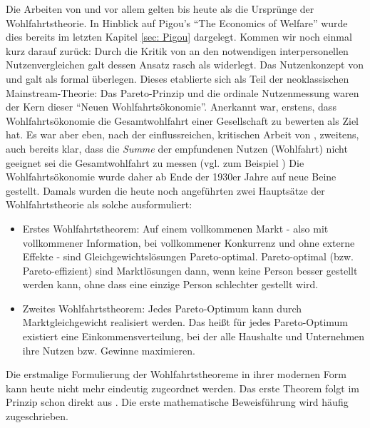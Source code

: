 Die Arbeiten von \textcite{Pareto1906} und vor allem \textcite{Pigou1920} gelten bis heute als die Ursprünge der Wohlfahrtstheorie. In Hinblick auf Pigou's "`The Economics of Welfare"' wurde dies bereits im letzten Kapitel \ref{sec: Pigou} dargelegt. Kommen wir noch einmal kurz darauf zurück: Durch die Kritik von \textcite{Robbins1932} an den notwendigen interpersonellen Nutzenvergleichen galt dessen Ansatz rasch als widerlegt. Das Nutzenkonzept von \textcite{Pareto1906} und \textcite{Hicks1934a} galt als formal überlegen. Dieses etablierte sich als Teil der neoklassischen Mainstream-Theorie: Das Pareto-Prinzip und die ordinale Nutzenmessung waren der Kern dieser "`Neuen Wohlfahrtsökonomie"'. Anerkannt war, erstens, dass Wohlfahrtsökonomie die Gesamtwohlfahrt einer Gesellschaft zu bewerten als Ziel hat. Es war aber eben, nach der einflussreichen, kritischen Arbeit von \textcite{Robbins1932}, zweitens, auch bereits klar, dass die \textit{Summe} der empfundenen Nutzen (Wohlfahrt) nicht geeignet sei die Gesamtwohlfahrt zu messen (vgl. zum Beispiel \textcite{Lange1942}) Die Wohlfahrtsökonomie wurde daher ab Ende der 1930er Jahre auf neue Beine gestellt. Damals wurden die heute noch angeführten zwei Hauptsätze der Wohlfahrtstheorie als solche ausformuliert:
\begin{itemize}
	\item Erstes Wohlfahrtstheorem: Auf einem vollkommenen Markt - also mit vollkommener Information, bei vollkommener Konkurrenz und ohne externe Effekte - sind Gleichgewichtslösungen Pareto-optimal. Pareto-optimal (bzw. Pareto-effizient) sind Marktlösungen dann, wenn keine Person besser gestellt werden kann, ohne dass eine einzige Person schlechter gestellt wird.
	\item Zweites Wohlfahrtstheorem: Jedes Pareto-Optimum kann durch Marktgleichgewicht realisiert werden. Das heißt für jedes Pareto-Optimum existiert eine Einkommensverteilung, bei der alle Haushalte und Unternehmen ihre Nutzen bzw. Gewinne maximieren.
\end{itemize}
Die erstmalige Formulierung der Wohlfahrtstheoreme in ihrer modernen Form kann heute nicht mehr eindeutig zugeordnet werden. Das erste Theorem folgt im Prinzip schon direkt aus \textcite{Pareto1906}. Die erste mathematische Beweisführung wird häufig \textcite{Lange1942} zugeschrieben. 

